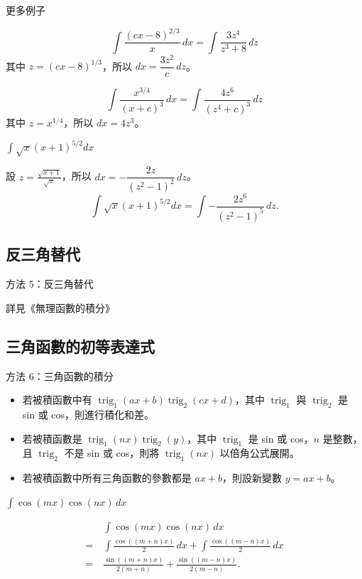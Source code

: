 \documentclass{beamer}
\newcommand{\trig}{\operatorname{trig}}
\theoremstyle{remark}
\begin{document}
\begin{frame}{更多例子}
  \begin{example}
    \[\int \frac{\left( cx-8 \right)^{2/3}}{x}\,dx = \int \frac{3z^4}{z^3 + 8}\,dz\]
    其中 $z = \left( cx-8 \right)^{1/3}$，所以 $dx = \dfrac{3z^2}{c}\,dz$。
  \end{example}
  \begin{example}
    \[\int \frac{x^{3/4}}{\left( x+c \right)^3}\,dx = \int \frac{4z^6}{\left( z^4 + c \right)^3}\,dz\]
    其中 $z = x^{1/4}$，所以 $dx = 4z^3$。
  \end{example}
\end{frame}

\begin{frame}{$\displaystyle \int \sqrt x \left( x+1 \right)^{5/2} dx$}
  \begin{example}
    設 $\displaystyle z = \frac{\sqrt{x+1}}{\sqrt x}$，所以 $dx = -\dfrac{2z}{\left( z^2 - 1 \right)^2}\,dz$。
    \[\int \sqrt x \left( x+1 \right)^{5/2} dx = \int -\frac{2z^6}{\left( z^2 - 1 \right)^5}\,dz.\]
  \end{example}
\end{frame}

\subsection{反三角替代}
\begin{frame}{方法 5：反三角替代}
  \centerline{詳見《無理函數的積分》}
\end{frame}

\subsection[三角函數]{三角函數的初等表達式}
\begin{frame}{方法 6：三角函數的積分}
  \begin{itemize}
    \item 若被積函數中有 $\trig_1(ax+b) \trig_2(cx+d)$，其中 $\trig_1$ 與 $\trig_2$ 是 sin 或 cos，則進行積化和差。
    \item 若被積函數是 $\trig_1(nx) \trig_2(y)$，其中 $\trig_1$ 是 sin 或 cos，$n$ 是整數，且 $\trig_2$ 不是 sin 或
      cos，則將 $\trig_1(nx)$ 以倍角公式展開。
    \item 若被積函數中所有三角函數的參數都是 $ax+b$，則設新變數 $y = ax+b$。
  \end{itemize}
\end{frame}

\begin{frame}{$\displaystyle \int \cos(mx) \cos(nx)\,dx$}
  \begin{solution}
    \begin{align*}
	 & \int \cos(mx) \cos(nx)\,dx\\
      =\:& \int \frac{\cos((m+n)x)}{2}\,dx + \int \frac{\cos((m-n)x)}{2}\,dx\\
      =\:& \frac{\sin((m+n)x)}{2 \left( m+n \right)} + \frac{\sin((m-n)x)}{2 \left( m-n \right)}.
    \end{align*}
  \end{solution}
\end{frame}
\end{document}
